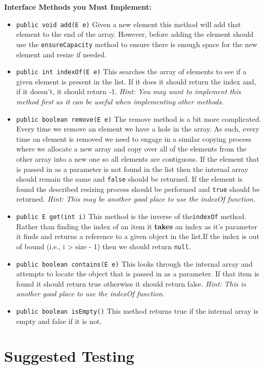 \documentclass[a4paper]{article}
\begin{document}
\newpage
\textbf{Interface Methods you Must Implement:}
\begin{itemize}
    \item \lstinline|public void add(E e)| Given a new element this method will add that element to the end of the array. However, before adding the element should use the \lstinline|ensureCapacity| method to ensure there is enough space for the new element and resize if needed.
    \item \lstinline|public int indexOf(E e)| This searches the array of elements to see if a given element is present in the list. If it does it should return the index and, if it doesn't, it should return -1. \textit{Hint: You may want to implement this method first as it can be useful when implementing other methods.}
    \item \lstinline|public boolean remove(E e)| The remove method is a bit more complicated. Every time we remove an element we have a hole in the array. As such, every time an element is removed we need to engage in a similar copying process where we allocate a new array and copy over all of the elements from the other array into a new one so all elements are contiguous. If the element that is passed in as a parameter is not found in the list then the internal array should remain the same and \lstinline|false| should be returned. If the element is found the described resizing process should be performed and \lstinline|true| should be returned. \textit{Hint: This may be another good place to use the indexOf function.}
    \item \lstinline|public E get(int i)| This method is the inverse of the\texttt{indexOf} method. Rather than finding the index of an item it \textbf{takes} an index as it's parameter it finds and returns a reference to a given object in the list.If the index is out of bound (i.e., i > size - 1) then we should return \lstinline|null|. 
    \item \lstinline|public boolean contains(E e)| This looks through the internal array and attempts to locate the object that is passed in as a parameter. If that item is found it should return true otherwise it should return false. \textit{Hint: This is another good place to use the indexOf function.}
    \item \lstinline|public boolean isEmpty()| This method returns true if the internal array is empty and false if it is not.
\end{itemize}

\section*{Suggested Testing}
\end{document}
